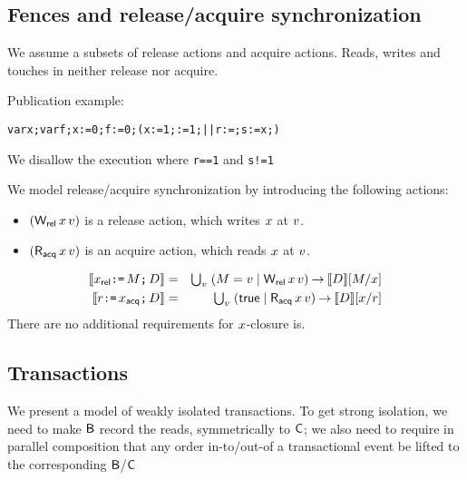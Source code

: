 \subsection{Fences and release/acquire synchronization}

We assume a subsets of release actions %
and acquire actions. %
Reads, writes and touches in neither release nor acquire.

Publication example:
\begin{alltt}
    var x; var f; x:=0; f:=0; (x:=1; :=1;  ||  r:=; s:=x;)
\end{alltt}
We disallow the execution where \texttt{r==1} and \texttt{s!=1}


We model release/acquire synchronization by introducing the
following actions:
\begin{itemize}
\item $(\mathsf{W_{rel}}\,x\,v)$ is a release action, which writes $x$ at $v$.
\item $(\mathsf{R_{acq}}\,x\,v)$ is an acquire action, which reads $x$ at $v$.
\end{itemize}
\begin{eqnarray*}
  \llbracket x_{\mathsf{rel}}\texttt{:=}\,M\texttt{;}\, D\rrbracket
  & = & \textstyle\bigcup_v\; (M=v \mid \mathsf{W_{rel}}\,x\,v) \mathbin\rightarrow \llbracket D\rrbracket[M/x]
  \\
  \llbracket r\texttt{:=}\,x_{\mathsf{acq}}\texttt{;}\, D\rrbracket
  & = & \textstyle\bigcup_v\; (\mathsf{true} \mid \mathsf{R_{acq}}\,x\,v) \mathbin\rightarrow \llbracket D\rrbracket[x/r] 
\end{eqnarray*}
There are no additional requirements for $x$-closure is.

\subsection{Transactions}

We present a model of weakly isolated transactions.  To get strong isolation,
we need to make $\mathsf{B}$ record the reads, symmetrically to $\DC{}{}$; we also need
to require in parallel composition that any order in-to/out-of a
transactional event be lifted to the corresponding $\mathsf{B}$/$\DC{}{}$

